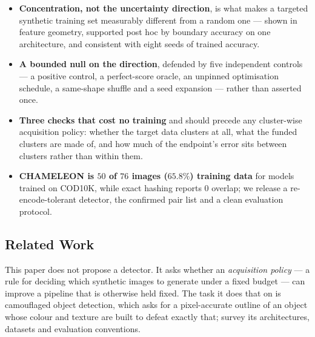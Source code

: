 \documentclass{article}
\begin{document}
\begin{itemize}
\itemsep0.04em
\item \textbf{Concentration, not the uncertainty direction}, is what makes a targeted synthetic
training set measurably different from a random one --- shown in feature geometry, supported post hoc
by boundary accuracy on one architecture, and consistent with eight seeds of trained accuracy.
\item \textbf{A bounded null on the direction}, defended by five independent controls --- a positive
control, a perfect-score oracle, an unpinned optimisation schedule, a same-shape shuffle and a seed
expansion --- rather than asserted once.
\item \textbf{Three checks that cost no training} and should precede any cluster-wise acquisition
policy: whether the target data clusters at all, what the funded clusters are made of, and how much
of the endpoint's error sits between clusters rather than within them.
\item \textbf{CHAMELEON is $50$ of $76$ images ($65.8\%$) training data} for models trained on
COD10K, while exact hashing reports $0$ overlap; we release a re-encode-tolerant detector, the
confirmed pair list and a clean evaluation protocol.
\end{itemize}

\subsection{Related Work}
\label{sec:related}
This paper does not propose a detector. It asks whether an \emph{acquisition policy} --- a rule for
deciding which synthetic images to generate under a fixed budget --- can improve a pipeline that is
otherwise held fixed. The task it does that on is camouflaged object detection, which asks for a
pixel-accurate outline of an object whose colour and texture are built to defeat exactly that;
\citet{fan2023advances} survey its architectures, datasets and evaluation conventions.
\end{document}
